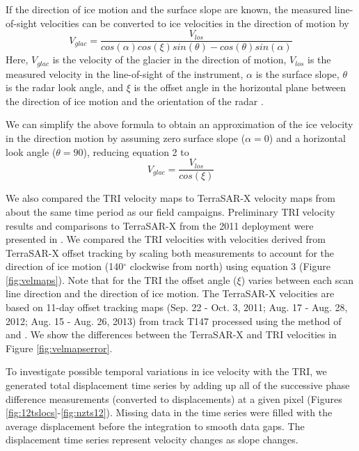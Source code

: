 If the direction of ice motion and the surface slope are known, the measured line-of-sight velocities can be converted to ice velocities in the direction of motion by 
  \begin{equation} V_{glac}=\frac{V_{los}}{cos(\alpha)cos(\xi)sin(\theta)-cos(\theta)sin(\alpha)}\end{equation} 
Here, $V_{glac}$ is the velocity of the glacier in the direction of motion, $V_{los}$ is the measured velocity in the line-of-sight of the instrument, $\alpha$ is the surface slope, $\theta$ is the radar look angle, and $\xi$ is the offset angle in the horizontal plane between the direction of ice motion and the orientation of the radar \citep{kwokandfahnestock}.

We can simplify the above formula to obtain an approximation of the ice velocity in the direction motion by assuming zero surface slope ($\alpha=0$) and a horizontal look angle ($\theta=90$), reducing equation 2 to 
  \begin{equation}  V_{glac}=\frac{V_{los}}{cos(\xi)}\end{equation} 
 
 
We also compared the TRI velocity maps to TerraSAR-X velocity maps from about the same time period as our field campaigns. Preliminary TRI
velocity results and comparisons to TerraSAR-X from the 2011 deployment were presented in \citet{voytenko2012monitoring}.
We compared the TRI velocities with velocities derived from TerraSAR-X offset tracking by scaling both measurements to account for the direction of ice motion (140$^{\circ}$ clockwise from north) using equation 3 (Figure \ref{fig:velmaps}). Note that for the TRI the offset angle ($\xi$) varies between each scan line direction and the direction of ice motion. The TerraSAR-X velocities are based on 11-day offset tracking maps (Sep. 22 - Oct. 3, 2011; Aug. 17 - Aug. 28, 2012; Aug. 15 - Aug. 26, 2013) from track T147 processed using the method of \citet{strozzi2002glacier} and \citet{ paul2013glaciers}. We show the differences between the TerraSAR-X and TRI velocities in Figure \ref{fig:velmapserror}.

  
To investigate possible temporal variations in ice velocity with the TRI, we generated total displacement time series by adding up all of the successive phase difference measurements (converted to displacements) at a given pixel (Figures \ref{fig:12tslocs}-\ref{fig:nzts12}). Missing data in the time series were filled with the average displacement before the integration to smooth data gaps. The displacement time series represent velocity changes as slope changes.

